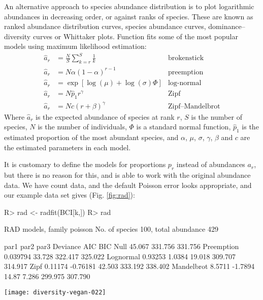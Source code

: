 \documentclass[article,nojss]{jss}
\begin{document}
An alternative approach to species abundance distribution is to plot
logarithmic abundances in decreasing order, or against ranks of
species.  These are known as ranked abundance
distribution curves, species abundance curves, dominance--diversity
curves or Whittaker plots.
Function  fits some of the most popular models using
maximum likelihood estimation:
\begin{align}
\hat a_r &= \frac{N}{S} \sum_{k=r}^S \frac{1}{k} &\text{brokenstick}\\
\hat a_r &= N \alpha (1-\alpha)^{r-1} & \text{preemption} \\
\hat a_r &= \exp \left[\log (\mu) + \log (\sigma) \Phi \right]
&\text{log-normal}\\
\hat a_r &= N \hat p_1 r^\gamma &\text{Zipf}\\
\hat a_r &= N c (r + \beta)^\gamma &\text{Zipf--Mandelbrot}
\end{align}
Where $\hat a_r$ is the expected abundance of species at rank $r$, $S$
is the number of species, $N$ is the number of individuals, $\Phi$ is
a standard normal function, $\hat p_1$ is the estimated proportion of
the most abundant species, and $\alpha$, $\mu$, $\sigma$, $\gamma$,
$\beta$ and $c$ are the estimated parameters in each model.

It is customary to define the models for proportions $p_r$ instead of
abundances $a_r$, but there is no reason for this, and 
is able to work with the original abundance data.  We have count data,
and the default Poisson error looks appropriate, and our example data
set gives (Fig. \ref{fig:rad}):
\begin{Schunk}
\begin{Sinput}
R> rad <- radfit(BCI[k,])
R> rad
\end{Sinput}
\begin{Soutput}
RAD models, family poisson 
No. of species 100, total abundance 429

           par1      par2     par3   Deviance AIC     BIC    
Null                                  45.067  331.756 331.756
Preemption  0.039794                  33.728  322.417 325.022
Lognormal   0.93253   1.0384          19.018  309.707 314.917
Zipf        0.11174  -0.76181         42.503  333.192 338.402
Mandelbrot  8.5711   -1.7894   14.87   7.286  299.975 307.790
\end{Soutput}
\end{Schunk}
\begin{SCfigure}
\texttt{[image: diversity-vegan-022]}
\caption{Ranked abundance distribution models for a random plot
  (no. 20).  The best model has the lowest \textsc{aic}.}
\label{fig:rad}
\end{SCfigure}
\end{document}
